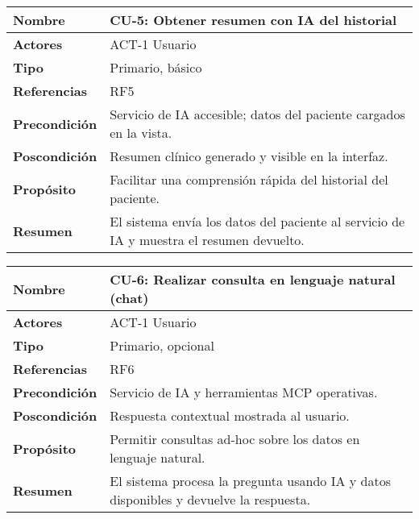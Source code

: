 \begin{table}[H]
    \centering
    \begin{tabular}{|l|p{11cm}|}
        \hline
        \textbf{Nombre} & CU-5: Obtener resumen con IA del historial \\
        \hline
        \textbf{Actores} & ACT-1 Usuario \\
        \hline
        \textbf{Tipo} & Primario, básico \\
        \hline
        \textbf{Referencias} & RF5 \\
        \hline
        \textbf{Precondición} & Servicio de IA accesible; datos del paciente cargados en la vista. \\
        \hline
        \textbf{Poscondición} & Resumen clínico generado y visible en la interfaz. \\
        \hline
        \textbf{Propósito} & Facilitar una comprensión rápida del historial del paciente. \\
        \hline
        \textbf{Resumen} & El sistema envía los datos del paciente al servicio de IA y muestra el resumen devuelto. \\
        \hline
    \end{tabular}
\end{table}

\begin{table}[H]
    \centering
    \begin{tabular}{|l|p{11cm}|}
        \hline
        \textbf{Nombre} & CU-6: Realizar consulta en lenguaje natural (chat) \\
        \hline
        \textbf{Actores} & ACT-1 Usuario \\
        \hline
        \textbf{Tipo} & Primario, opcional \\
        \hline
        \textbf{Referencias} & RF6 \\
        \hline
        \textbf{Precondición} & Servicio de IA y herramientas MCP operativas. \\
        \hline
        \textbf{Poscondición} & Respuesta contextual mostrada al usuario. \\
        \hline
        \textbf{Propósito} & Permitir consultas ad-hoc sobre los datos en lenguaje natural. \\
        \hline
        \textbf{Resumen} & El sistema procesa la pregunta usando IA y datos disponibles y devuelve la respuesta. \\
        \hline
    \end{tabular}
\end{table}


